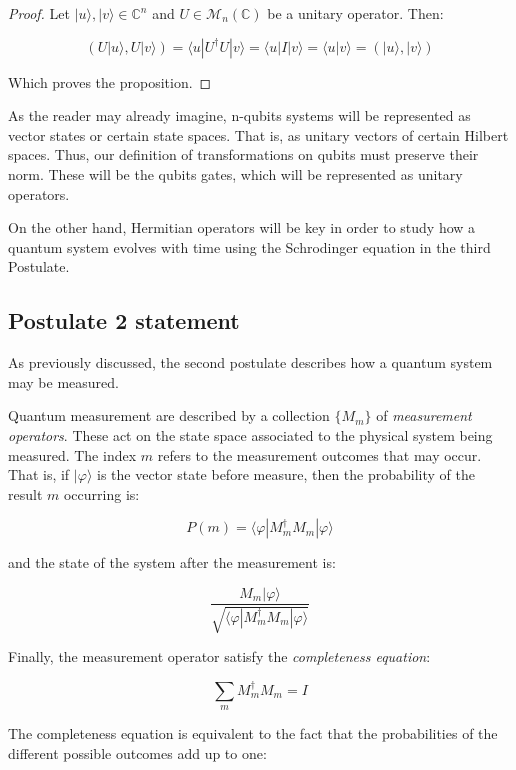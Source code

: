 \begin{proof}
	Let $|u\rangle, |v\rangle \in \mathds{C}^n$ and $U \in \mathcal{M}_n(\mathds{C})$ be a unitary operator. Then:
	
	$$ ( U|u\rangle, U|v\rangle) = \langle u|U^\dagger U|v\rangle = \langle u|I|v\rangle = \langle u|v\rangle = ( |u\rangle, |v\rangle) $$
	
	Which proves the proposition.
\end{proof}

As the reader may already imagine, n-qubits systems will be represented as vector states or certain state spaces. That is, as unitary vectors of certain Hilbert spaces. Thus, our definition of transformations on qubits must preserve their norm. These will be the qubits gates, which will be represented as unitary operators.

On the other hand, Hermitian operators will be key in order to study how a quantum system evolves with time using the Schrodinger equation in the third Postulate.


\subsection{Postulate 2 statement}


As previously discussed, the second postulate describes how a quantum system may be measured.

\begin{postulate}
	Quantum measurement are described by a collection $\{M_m\}$ of \emph{measurement operators}. These act on the state space associated to the physical system being measured. The index $m$ refers to the measurement outcomes that may occur. That is, if $|\varphi\rangle$ is the vector state before measure, then the probability of the result $m$ occurring is:
	
	$$P(m) = \langle\varphi|M_m^\dagger M_m|\varphi\rangle $$
	
	and the state of the system after the measurement is:
	
	$$ \frac{M_m|\varphi\rangle}{\sqrt{\langle\varphi|M_m^\dagger M_m|\varphi\rangle}}$$
	
	Finally, the measurement operator satisfy the \emph{completeness equation}: 
	
	$$\sum_m M_m^\dagger M_m = I$$
\end{postulate}

The completeness equation is equivalent to the fact that the probabilities of the different possible outcomes add up to one:

